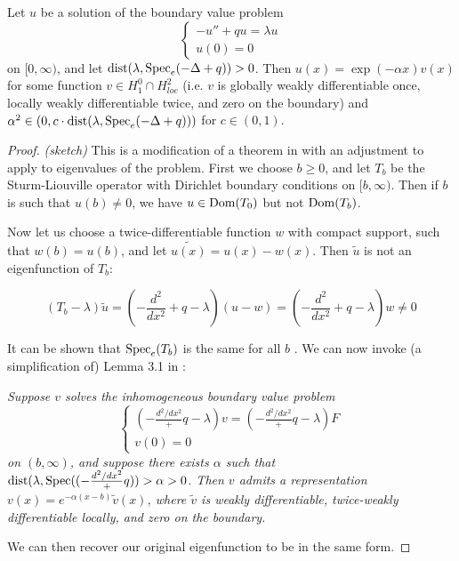 \documentclass[../main.tex]{subfiles}
\begin{document}
\begin{theorem}
  Let $u$ be a solution of the boundary value problem 
    $$ 
    \begin{cases}
	-u'' + qu = \lambda u \\
	u(0) = 0
    \end{cases} 
    $$ 
  on $[0, \infty)$, and let $\mathrm{dist}(\lambda, \mathrm{Spec}_e(-\Delta + q)) > 0$.
  Then $u(x) = \exp(-\alpha x) v(x)$ for some function $v \in H_1^0 \cap H^2_{loc}$
  (i.e. $v$ is globally weakly differentiable once, locally weakly differentiable twice,
  and zero on the boundary) and 
  $\alpha^2 \in (0, c\cdot\mathrm{dist}(\lambda, \mathrm{Spec}_e(-\Delta + q)))$
  for $c \in (0, 1)$.
\end{theorem}
\begin{proof}\emph{(sketch)}
This is a modification of a theorem in \cite{aljawi2023eigenvalues} with an adjustment
to apply to eigenvalues of the problem. First we choose $b \geq 0$, and let $T_{b}$
be the Sturm-Liouville operator with Dirichlet boundary conditions on $[b, \infty)$.
Then if $b$ is such that $u(b) \neq 0$, we have $u \in \mathrm{Dom}(T_0)$ but not $\mathrm{Dom}(T_b)$.

Now let us choose a twice-differentiable function $w$ with compact support, such that
$w(b) = u(b)$, and let $\tilde{u(x)} = u(x) - w(x)$. Then $\tilde{u}$ is not an
eigenfunction of $T_b$:

  $$(T_b - \lambda)\tilde{u} 
    = (-\frac{d^2}{dx^2} + q - \lambda)(u - w)
    = (-\frac{d^2}{dx^2} + q - \lambda)w \neq 0$$

It can be shown that $\mathrm{Spec}_e(T_b)$ is the same for all $b$ \cite{akhiezer2013theory}.
  We can now invoke (a simplification of) Lemma 3.1 in \cite{aljawi2023eigenvalues}:
  \begin{displayquote}\emph{
  Suppose $v$ solves the inhomogeneous boundary value problem
  $$
  \begin{cases}
    (-\frac{d^2/dx^2} + q - \lambda)v = (-\frac{d^2/dx^2} + q - \lambda)F \\
    v(0) = 0
  \end{cases}
  $$
  on $(b, \infty)$, and suppose there exists $\alpha$ such that
  $\mathrm{dist}(\lambda, \mathrm{Spec}((-\frac{d^2/dx^2} + q)) > \alpha > 0$.
  Then $v$ admits a representation $v(x) = e^{-\alpha(x-b)}\tilde{v}(x)$, where
  $\tilde{v}$ is weakly differentiable, twice-weakly differentiable locally,
    and zero on the boundary.}
\end{displayquote}
We can then recover our original eigenfunction to be in the same form.
\end{proof}
\end{document}
